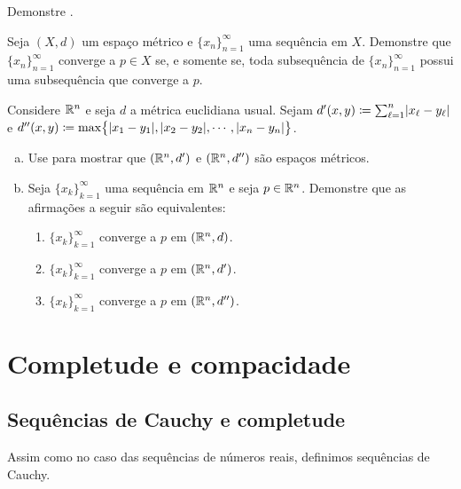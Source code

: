 \begin{exercise}
Demonstre .
\end{exercise}

\begin{exercise}
Seja $(X,d)$ um espaço métrico e $\{ x_n \}_{n=1}^\infty$ uma sequência em $X$.
Demonstre que $\{ x_n \}_{n=1}^\infty$ converge a $p \in X$
se, e somente se, toda subsequência de $\{ x_n \}_{n=1}^\infty$ possui
uma subsequência que converge a $p$.
\end{exercise}

\begin{exercise}
Considere ${\mathbb{R}}^n$ e seja $d$ a métrica euclidiana usual.
Sejam
$d'(x,y) \coloneqq \sum_{\ell=1}^n \lvert {x_\ell-y_\ell} \rvert$ e
$d''(x,y) \coloneqq \max \bigl\{
\lvert {x_1-y_1} \rvert,\lvert {x_2-y_2} \rvert,\cdots,\lvert {x_n-y_n} \rvert
\bigr\}$.
\begin{enumerate}[a)]
\item
Use  para mostrar que
$({\mathbb{R}}^n,d')$ e
$({\mathbb{R}}^n,d'')$ são espaços métricos.
\item
Seja $\{ x_k \}_{k=1}^\infty$ uma sequência em ${\mathbb{R}}^n$ e seja $p \in {\mathbb{R}}^n$.
Demonstre que as afirmações a seguir são equivalentes:
\begin{enumerate}[(1)]
\item
$\{ x_k \}_{k=1}^\infty$ converge a $p$ em $({\mathbb{R}}^n,d)$.
\item
$\{ x_k \}_{k=1}^\infty$ converge a $p$ em $({\mathbb{R}}^n,d')$.
\item
$\{ x_k \}_{k=1}^\infty$ converge a $p$ em $({\mathbb{R}}^n,d'')$.
\end{enumerate}
\end{enumerate}
\end{exercise}


\sectionnewpage
\section{Completude e compacidade}
\label{sec:metcompact}



\subsection{Sequências de Cauchy e completude}

Assim como no caso das sequências de números reais, definimos sequências
de Cauchy.

